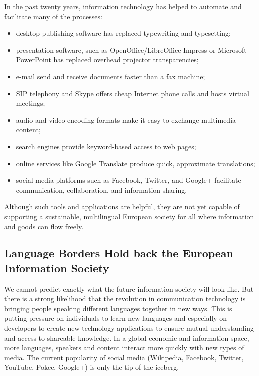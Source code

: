 \begin{multicols}{2}
In the past twenty years, information technology has helped to automate and facilitate many of the processes:

\begin{itemize}
\item desktop publishing software has replaced typewriting and typesetting;
\item presentation software, such as OpenOffice/LibreOffice Impress or Microsoft PowerPoint has replaced overhead projector transparencies;
\item e-mail send and receive documents faster than a fax machine;
\item SIP telephony and Skype offers cheap Internet phone calls and hosts virtual meetings;
\item audio and video encoding formats make it easy to exchange multimedia content;
\item search engines provide keyword-based access to web pages;
\item online services like Google Translate produce quick, approximate translations;
\item social media platforms such as Facebook, Twitter, and Google+ facilitate communication, collaboration, and information sharing.
\end{itemize}

Although such tools and applications are helpful, they are not yet capable of supporting a sustainable, multilingual European society for all where information and goods can flow freely.

\subsection{Language Borders Hold back the European Information Society}

We cannot predict exactly what the future information society will look like. 
But there is a strong likelihood that the revolution in communication technology is bringing people speaking different languages together in new ways. This is putting pressure on individuals to learn new languages and especially on developers to create new technology applications to ensure mutual understanding and access to shareable knowledge. In a global economic and information space, more languages, speakers and content interact more quickly with new types of media. The current popularity of social media (Wikipedia, Facebook, Twitter, YouTube, Pokec, Google+) is only the tip of the iceberg.



\end{multicols}
